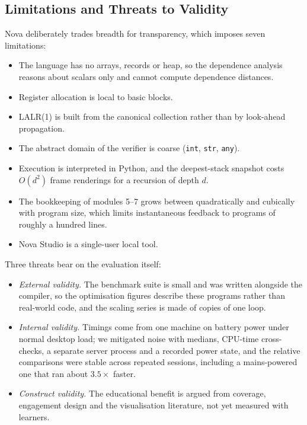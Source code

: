 \documentclass[conference]{IEEEtran}
\newcommand{\code}[1]{\texttt{#1}}
\begin{document}
\subsection{Limitations and Threats to Validity}
Nova deliberately trades breadth for transparency, which imposes seven limitations:
\begin{itemize}
\item The language has no arrays, records or heap, so the dependence analysis reasons about scalars only and cannot compute dependence distances.
\item Register allocation is local to basic blocks.
\item LALR(1) is built from the canonical collection rather than by look-ahead propagation.
\item The abstract domain of the verifier is coarse (\code{int}, \code{str}, \code{any}).
\item Execution is interpreted in Python, and the deepest-stack snapshot costs $O(d^2)$ frame renderings for a recursion of depth $d$.
\item The bookkeeping of modules 5--7 grows between quadratically and cubically with program size, which limits instantaneous feedback to programs of roughly a hundred lines.
\item Nova Studio is a single-user local tool.
\end{itemize}
Three threats bear on the evaluation itself:
\begin{itemize}
\item \emph{External validity.} The benchmark suite is small and was written alongside the compiler, so the optimisation figures describe these programs rather than real-world code, and the scaling series is made of copies of one loop.
\item \emph{Internal validity.} Timings come from one machine on battery power under normal desktop load; we mitigated noise with medians, CPU-time cross-checks, a separate server process and a recorded power state, and the relative comparisons were stable across repeated sessions, including a mains-powered one that ran about $3.5\times$ faster.
\item \emph{Construct validity.} The educational benefit is argued from coverage, engagement design and the visualisation literature, not yet measured with learners.
\end{itemize}

\end{document}
